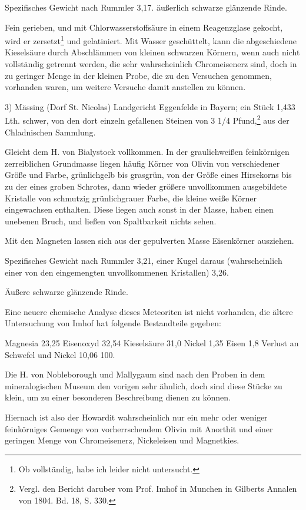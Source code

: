 \documentclass[a4paper, 11pt, oneside]{article}
\begin{document}
Spezifisches Gewicht nach Rummler 3,17. äußerlich schwarze glänzende Rinde.

Fein gerieben, und mit Chlorwasserstoffsäure in einem Reagenzglase gekocht, wird er zersetzt\footnote{Ob vollständig, habe ich leider nicht untersucht.} und gelatiniert. Mit Wasser geschüttelt, kann die abgeschiedene Kieselsäure durch Abschlämmen von kleinen schwarzen Körnern, wenn auch nicht vollständig getrennt werden, die sehr wahrscheinlich Chromeisenerz sind, doch in zu geringer Menge in der kleinen Probe, die zu den Versuchen genommen, vorhanden waren, um weitere Versuche damit anstellen zu können.

3) Mässing (Dorf St. Nicolas) Landgericht Eggenfelde in Bayern; ein Stück 1,433 Lth. schwer, von den dort einzeln gefallenen Steinen von 3 1/4 Pfund,\footnote{Vergl. den Bericht daruber vom Prof. Imhof in Munchen in Gilberts Annalen von 1804. Bd. 18, S. 330.} aus der Chladnischen Sammlung.

Gleicht dem H. von Bialystock vollkommen. In der graulichweißen feinkörnigen zerreiblichen Grundmasse liegen häufig Körner von Olivin von verschiedener Größe und Farbe, grünlichgelb bis grasgrün, von der Größe eines Hirsekorns bis zu der eines groben Schrotes, dann wieder größere unvollkommen ausgebildete Kristalle von schmutzig grünlichgrauer Farbe, die kleine weiße Körner eingewachsen enthalten. Diese liegen auch sonst in der Masse, haben einen unebenen Bruch, und ließen von Spaltbarkeit nichts sehen.

Mit den Magneten lassen sich aus der gepulverten Masse Eisenkörner ausziehen.

Spezifisches Gewicht nach Rummler 3,21, einer Kugel daraus (wahrscheinlich einer von den eingemengten unvollkommenen Kristallen) 3,26.

Äußere schwarze glänzende Rinde.

Eine neuere chemische Analyse dieses Meteoriten ist nicht vorhanden, die ältere Untersuchung von Imhof hat folgende Bestandteile gegeben:

Magnesia 23,25  
Eisenoxyd 32,54  
Kieselsäure 31,0  
Nickel 1,35  
Eisen 1,8  
Verlust an Schwefel und Nickel 10,06  
100.  

Die H. von Nobleborough und Mallygaum sind nach den Proben in dem mineralogischen Museum den vorigen sehr ähnlich, doch sind diese Stücke zu klein, um zu einer besonderen Beschreibung dienen zu können.

Hiernach ist also der Howardit wahrscheinlich nur ein mehr oder weniger feinkörniges Gemenge von vorherrschendem Olivin mit Anorthit und einer geringen Menge von Chromeisenerz, Nickeleisen und Magnetkies.
\end{document}
